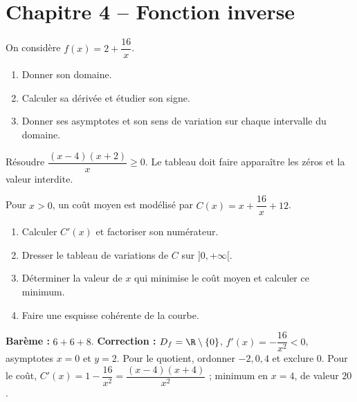 \section*{Chapitre 4 -- Fonction inverse}
\begin{exercise}
On considère $f(x)=2+\dfrac{16}x$.
\begin{enumerate}
\item Donner son domaine.
\item Calculer sa dérivée et étudier son signe.
\item Donner ses asymptotes et son sens de variation sur chaque intervalle du domaine.
\end{enumerate}
\end{exercise}
\begin{exercise}
Résoudre $\dfrac{(x-4)(x+2)}x\geq0$. Le tableau doit faire apparaître les zéros et la valeur interdite.
\end{exercise}
\begin{exercise}
Pour $x>0$, un coût moyen est modélisé par $C(x)=x+\dfrac{16}x+12$.
\begin{enumerate}
\item Calculer $C'(x)$ et factoriser son numérateur.
\item Dresser le tableau de variations de $C$ sur $]0,+\infty[$.
\item Déterminer la valeur de $x$ qui minimise le coût moyen et calculer ce minimum.
\item Faire une esquisse cohérente de la courbe.
\end{enumerate}
\end{exercise}
\begin{solution}\textbf{Barème :} $6+6+8$. \textbf{Correction :} $D_f=\R\setminus\{0\}$, $f'(x)=-\dfrac{16}{x^2}<0$, asymptotes $x=0$ et $y=2$. Pour le quotient, ordonner $-2,0,4$ et exclure $0$. Pour le coût, $C'(x)=1-\dfrac{16}{x^2}=\dfrac{(x-4)(x+4)}{x^2}$ ; minimum en $x=4$, de valeur $20$.\end{solution}

